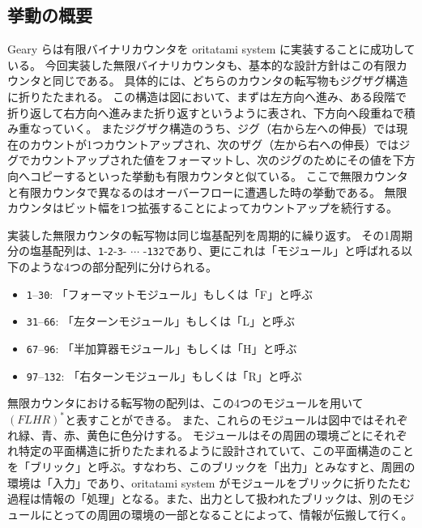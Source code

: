 \documentclass[a4,11pt]{article}
\begin{document}

\subsection{挙動の概要}
Geary らは有限バイナリカウンタを oritatami system に実装することに成功している\cite{GeMeScSe2019}。
今回実装した無限バイナリカウンタも、基本的な設計方針はこの有限カウンタと同じである。
具体的には、どちらのカウンタの転写物もジグザグ構造に折りたたまれる。
この構造は図において、まずは左方向へ進み、ある段階で折り返して右方向へ進みまた折り返すというように表され、下方向へ段重ねで積み重なっていく。
またジグザク構造のうち、ジグ（右から左への伸長）では現在のカウントが1つカウントアップされ、次のザグ（左から右への伸長）ではジグでカウントアップされた値をフォーマットし、次のジグのためにその値を下方向へコピーするといった挙動も有限カウンタと似ている。
ここで無限カウンタと有限カウンタで異なるのはオーバーフローに遭遇した時の挙動である。
無限カウンタはビット幅を1つ拡張することによってカウントアップを続行する。
%
%


実装した無限カウンタの転写物は同じ塩基配列を周期的に繰り返す。
その1周期分の塩基配列は、\texttt{1}-\texttt{2}-\texttt{3}- $\cdots$ -\texttt{132}であり、更にこれは「モジュール」と呼ばれる以下のような4つの部分配列に分けられる。

\begin{itemize}
\item \texttt{1}--\texttt{30}: 「フォーマットモジュール」もしくは「F」と呼ぶ
\item \texttt{31}--\texttt{66}: 「左ターンモジュール」もしくは「L」と呼ぶ
\item \texttt{67}--\texttt{96}: 「半加算器モジュール」もしくは「H」と呼ぶ
\item \texttt{97}--\texttt{132}: 「右ターンモジュール」もしくは「R」と呼ぶ
\end{itemize}

無限カウンタにおける転写物の配列は、この4つのモジュールを用いて$(FLHR)^*$と表すことができる。
また、これらのモジュールは図中ではそれぞれ緑、青、赤、黄色に色分けする。
モジュールはその周囲の環境ごとにそれぞれ特定の平面構造に折りたたまれるように設計されていて、この平面構造のことを「ブリック」と呼ぶ。すなわち、このブリックを「出力」とみなすと、周囲の環境は「入力」であり、oritatami system がモジュールをブリックに折りたたむ過程は情報の「処理」となる。また、出力として扱われたブリックは、別のモジュールにとっての周囲の環境の一部となることによって、情報が伝搬して行く。
\end{document}
